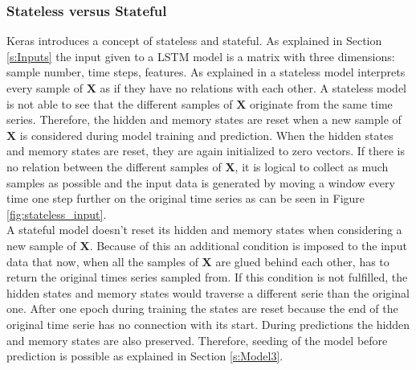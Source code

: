 \subsubsection{Stateless versus Stateful}
Keras introduces a concept of stateless and stateful. As explained in Section \ref{s:Inputs} the input given to a LSTM model is a matrix with three dimensions: sample number, time steps, features. As explained in \cite{FneishMo} a stateless model interprets every sample of $ \bm{X} $ as if they have no relations with each other. A stateless model is not able to see that the different samples of $ \bm{X} $ originate from the same time series. Therefore, the hidden and memory states are reset when a new sample of $ \bm{X} $ is considered during model training and prediction. When the hidden states and memory states are reset, they are again initialized to zero vectors. If there is no relation between the different samples of $ \bm{X} $, it is logical to collect as much samples as possible and the input data is generated by moving a window every time one step further on the original time series as can be seen in Figure \ref{fig:stateless_input}.\\

A stateful model doesn't reset its hidden and memory states when considering a new sample of $ \bm{X} $. Because of this an additional condition is imposed to the input data that now, when all the samples of $ \bm{X} $ are glued behind each other, has to return the original times series sampled from. If this condition is not fulfilled, the hidden states and memory states would traverse a different serie than the original one. After one epoch during training the states are reset because the end of the original time serie has no connection with its start. During predictions the hidden and memory states are also preserved. Therefore, seeding of the model before prediction is possible as explained in Section \ref{s:Model3}.\\

